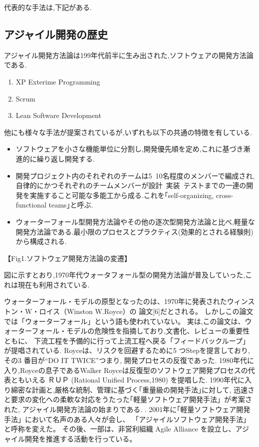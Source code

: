 \documentclass[paper]{jrsj}
\begin{document}
代表的な手法は,下記がある.

\subsection{アジャイル開発の歴史}
アジャイル開発方法論は199年代前半に生み出された,ソフトウェアの開発方法論である.

\begin{enumerate}
  \item XP Exterime Programming
  \item Scrum
  \item Lean Software Development   
\end{enumerate}

他にも様々な手法が提案されているが,いずれも以下の共通の特徴を有している.

\begin{itemize}
  \item ソフトウェアを小さな機能単位に分割し,開発優先順を定め,これに基づき漸進的に繰り返し開発する.
  \item 開発プロジェクト内のそれぞれのチームは5~10名程度のメンバーで編成され,自律的にかつそれぞれのチームメンバーが設計~実装~テストまでの一連の開発を実施すること可能な多能工から成る.これを｢self-organizing, cross-functional teams｣と呼ぶ.
  \item ウォーターフォール型開発方法論やその他の逐次型開発方法論と比べ,軽量な開発方法論である.最小限のプロセスとプラクティス(効果的とされる経験則)から構成される.   
\end{itemize}

【Fig1.ソフトウェア開発方法論の変遷】

図に示すとおり,1970年代ウォータフォール型の開発方法論が普及していった,これは現在も利用されている.

ウォーターフォール・モデルの原型となったのは、1970年に発表されたウィンストン・W・ロイス（Winston W.Royce）の
論文[6]だとされる。
しかしこの論文では「ウォーターフォール」という語も使われていない。
実は,この論文は、ウォーターフォール・モデルの危険性を指摘しており,文書化、レビューの重要性ともに、
下流工程を予備的に行って上流工程へ戻る「フィードバックループ」が提唱されている. 
Royceは、リスクを回避するために5 つStepを提言しており,その3 番目が“DO IT TWICE”つまり,
開発プロセスの反復であった. 
1980年代に入り,Royceの息子であるWalker Royceは反復型のソフトウェア開発プロセスの代表ともいえる
ＲＵＰ (Rational Unified Process,1980) を提唱した.
1990年代に入り綿密な計画と,厳格な統制、管理に基づく｢重量級の開発手法｣に対して,
迅速さと要求の変化への柔軟な対応をうたった｢軽量ソフトウェア開発手法」が考案された,
アジャイル開発方法論の始まりである.
. 2001年に｢軽量ソフトウェア開発手法」において名声のある人々が会し、
「アジャイルソフトウェア開発手法」と呼称を変えた。 
その後、一部は、非営利組織 Agile Alliance を設立し、アジャイル開発を推進する活動を行っている。
\end{document}

